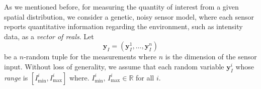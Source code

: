 \documentclass[journal]{IEEEtran}
\newcommand{\vect}[1]{\boldsymbol{#1}}
\begin{document}
As we mentioned before, for measuring the quantity of interest from a given spatial distribution, we consider a genetic, noisy sensor model, where each sensor reports  quantitative information regarding the environment, such as intensity data, as a \emph{vector of reals}. Let \[\bm{y}_I= (\bm{y}_I^1,\dots,\bm{y}_I^n)\] be a $n$-random tuple for the measurements where $n$ is the dimension of the sensor input. 
Without loss of generality, we assume that each random variable $\bm{y}_I^i$ whose \emph{range} is $[I_{\min}^i,I_{\max}^i]$ where. $I_{\min}^i,\,I_{\max}^i \in \mathbb{R}$ for all $i$.






\end{document}
